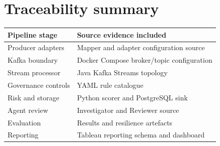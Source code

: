 \documentclass[12pt]{article}
\begin{document}
\section*{Traceability summary}
\begin{center}
\begin{tabular}{p{}p{}}
\toprule
\textbf{Pipeline stage} & \textbf{Source evidence included}\\
\midrule
Producer adapters & Mapper and adapter configuration source\\
Kafka boundary & Docker Compose broker/topic configuration\\
Stream processor & Java Kafka Streams topology\\
Governance controls & YAML rule catalogue\\
Risk and storage & Python scorer and PostgreSQL sink\\
Agent review & Investigator and Reviewer source\\
Evaluation & Results and resilience artefacts\\
Reporting & Tableau reporting schema and dashboard\\
\bottomrule
\end{tabular}
\end{center}
\end{document}
